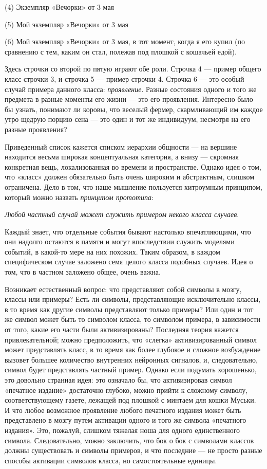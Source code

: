 \documentclass[../main.tex]{subfiles}
\begin{document}
(4) Экземпляр «Вечорки» от 3 мая

(5) Мой экземпляр «Вечорки» от 3 мая

(6) Мой экземпляр «Вечорки» от 3 мая, в тот момент, когда я его купил (по сравнению с тем, каким он стал, полежав под плошкой с кошачьей едой).

Здесь строчки со второй по пятую играют обе роли. Строчка 4 --- пример общего класс строчки 3, и строчка 5 --- пример строчки 4. Строчка 6 --- это особый случай примера данного класса: \emph{проявление}. Разные состояния одного и того же предмета в разные моменты его жизни --- это его проявления. Интересно было бы узнать, понимают ли коровы, что веселый фермер, скармливающий им каждое утро щедрую порцию сена --- это один и тот же индивидуум, несмотря на его разные проявления?

Приведенный список кажется списком иерархии общности --- на вершине находится весьма широкая концептуальная категория, а внизу --- скромная конкретная вещь, локализованная во времени и пространстве. Однако идея о том, что «класс» должен обязательно быть очень широким и абстрактным, слишком ограничена. Дело в том, что наше мышление пользуется хитроумным принципом, который можно назвать \emph{принципом прототипа}:

\emph{Любой частный случай может служить примером некого класса случаев}.

Каждый знает, что отдельные события бывают настолько впечатляющими, что они надолго остаются в памяти и могут впоследствии служить моделями событий, в какой-то мере на них похожих. Таким образом, в каждом специфическом случае заложено семя целого класса подобных случаев. Идея о том, что в частном заложено общее, очень важна.

Возникает естественный вопрос: что представляют собой символы в мозгу, классы или примеры? Есть ли символы, представляющие исключительно классы, в то время как другие символы представляют только примеры? Или один и тот же символ может быть то символом класса, то символом примера, в зависимости от того, какие его части были активизированы? Последняя теория кажется привлекательной; можно предположить, что «слегка» активизированный символ может представлять класс, в то время как более глубокое и сложное возбуждение вызовет большее количество внутренних нейронных сигналов, и, следовательно, символ будет представлять частный пример. Однако если подумать хорошенько, это довольно странная идея: это означало бы, что активизировав символ «печатное издание» достаточно глубоко, можно прийти к сложному символу, соответствующему газете, лежащей под плошкой с минтаем для кошки Муськи. И что любое возможное проявление любого печатного издания может быть представлено в мозгу путем активации одного и того же символа «печатного издания». Это, пожалуй, слишком тяжелая ноша для одного единственного символа. Следовательно, можно заключить, что бок о бок с символами классов должны существовать и символы примеров, и что последние --- не просто разные способы активации символов класса, но самостоятельные единицы.
\end{document}
